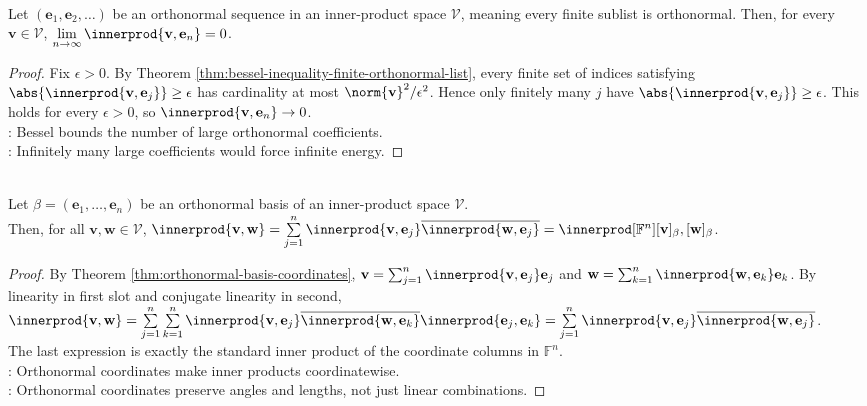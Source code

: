 \begin{corollary} \label{cor:orthonormal-sequence-coefficients-vanish} \\
Let $(\mathbf{e}_1,\mathbf{e}_2,\ldots)$ be an orthonormal sequence in an inner-product space $\mathcal{V}$, meaning every finite sublist is orthonormal. Then, for every $\mathbf{v}\in\mathcal{V}$, $\lim\limits_{n\to\infty}\innerprod{\mathbf{v},\mathbf{e}_n}=0$.
\begin{proof}
Fix $\epsilon>0$. By Theorem \ref{thm:bessel-inequality-finite-orthonormal-list}, every finite set of indices satisfying $\abs{\innerprod{\mathbf{v},\mathbf{e}_j}}\geq\epsilon$ has cardinality at most $\norm{\mathbf{v}}^2/\epsilon^2$. Hence only finitely many $j$ have $\abs{\innerprod{\mathbf{v},\mathbf{e}_j}}\geq\epsilon$. This holds for every $\epsilon>0$, so $\innerprod{\mathbf{v},\mathbf{e}_n}\to0$.\\
: Bessel bounds the number of large orthonormal coefficients.\\
: Infinitely many large coefficients would force infinite energy.
\end{proof}
\end{corollary}

\begin{theorem} \label{thm:parseval-identity-finite-dimensional} \\
Let $\beta=(\mathbf{e}_1,\ldots,\mathbf{e}_n)$ be an orthonormal basis of an inner-product space $\mathcal{V}$.\\
Then, for all $\mathbf{v},\mathbf{w}\in\mathcal{V}$, $\innerprod{\mathbf{v},\mathbf{w}} =\sum\limits_{j=1}^{n}\innerprod{\mathbf{v},\mathbf{e}_j}\overline{\innerprod{\mathbf{w},\mathbf{e}_j}} =\innerprod[\mathbb{F}^n]{[\mathbf{v}]_{\beta},[\mathbf{w}]_{\beta}}$.
\begin{proof}
By Theorem \ref{thm:orthonormal-basis-coordinates}, $\mathbf{v}=\sum_{j=1}^{n}\innerprod{\mathbf{v},\mathbf{e}_j}\mathbf{e}_j$ and $\mathbf{w}=\sum_{k=1}^{n}\innerprod{\mathbf{w},\mathbf{e}_k}\mathbf{e}_k$. By linearity in first slot and conjugate linearity in second, $\innerprod{\mathbf{v},\mathbf{w}} =\sum\limits_{j=1}^{n}\sum\limits_{k=1}^{n} \innerprod{\mathbf{v},\mathbf{e}_j}\overline{\innerprod{\mathbf{w},\mathbf{e}_k}} \innerprod{\mathbf{e}_j,\mathbf{e}_k} =\sum\limits_{j=1}^{n}\innerprod{\mathbf{v},\mathbf{e}_j}\overline{\innerprod{\mathbf{w},\mathbf{e}_j}}$.\\
The last expression is exactly the standard inner product of the coordinate columns in $\mathbb{F}^n$.\\
: Orthonormal coordinates make inner products coordinatewise.\\
: Orthonormal coordinates preserve angles and lengths, not just linear combinations.
\end{proof}
\end{theorem}

